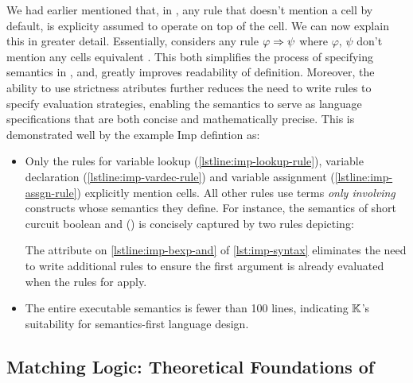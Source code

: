 We had earlier mentioned that, in \K{},
any rule that doesn't mention
a cell by default, is explicity assumed to operate on top
of the  cell. We can now explain this in greater
detail. Essentially, \K{} considers any rule $\varphi \Rightarrow \psi$
where $\varphi$, $\psi$ don't mention any cells equivalent
.
This both simplifies the process of specifying semantics in \K{}, and,
greatly improves readability of \K{} definition. Moreover, the
ability to use strictness atributes further reduces the
need to write rules to specify evaluation strategies, enabling
the semantics to serve as language specifications that are both
concise and mathematically precise. This is demonstrated well
by the example Imp defintion as:
\begin{itemize}
  \item Only the rules for variable lookup (\autoref{lstline:imp-lookup-rule}),
    variable declaration (\autoref{lstline:imp-vardec-rule}) and
    variable assignment (\autoref{lstline:imp-assgn-rule}) explicitly
    mention cells. All other rules use terms \emph{only involving} constructs
    whose semantics they define. For instance, the semantics of
    short curcuit boolean and (\inlinek{&&}) is concisely captured
    by two rules depicting:
    The  attribute
    on \autoref{lstline:imp-bexp-and} of \autoref{lst:imp-syntax}
    eliminates the need to write additional rules to ensure the
    first argument is already evaluated when the rules for
    \inlinek{&&} apply.
  \item The entire executable semantics is fewer than 100 lines,
    indicating $\mathbb{K}{}$'s suitability for semantics-first language design.
\end{itemize}

\subsection{Matching Logic: Theoretical Foundations of \K{}}

